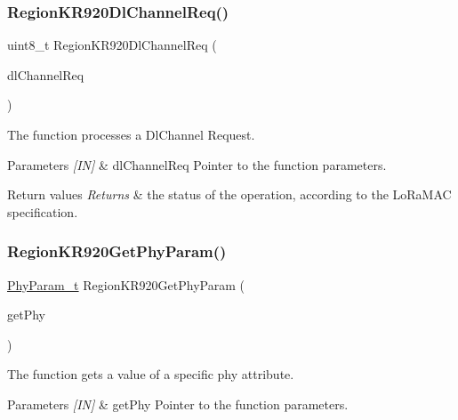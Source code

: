 \subsubsection{\texorpdfstring{Region\+K\+R920\+Dl\+Channel\+Req()}{RegionKR920DlChannelReq()}}
{\footnotesize\ttfamily uint8\+\_\+t Region\+K\+R920\+Dl\+Channel\+Req (\begin{DoxyParamCaption}\item[{\hyperlink{group__REGION_gae0d608ff1f8ea0a430e4f9a4c38ec7f3}{Dl\+Channel\+Req\+Params\+\_\+t} $\ast$}]{dl\+Channel\+Req }\end{DoxyParamCaption})}



The function processes a Dl\+Channel Request. 


\begin{DoxyParams}{Parameters}
{\em \mbox{[}\+I\+N\mbox{]}} & dl\+Channel\+Req Pointer to the function parameters.\\
\hline
\end{DoxyParams}

\begin{DoxyRetVals}{Return values}
{\em Returns} & the status of the operation, according to the Lo\+Ra\+M\+AC specification. \\
\hline
\end{DoxyRetVals}
\mbox{\label{group__REGIONKR920_ga108b8547f585d92dd1198c18fc262fa2}} 
\subsubsection{\texorpdfstring{Region\+K\+R920\+Get\+Phy\+Param()}{RegionKR920GetPhyParam()}}
{\footnotesize\ttfamily \hyperlink{group__REGION_gaed159b26e5c4677236b6e8677019db30}{Phy\+Param\+\_\+t} Region\+K\+R920\+Get\+Phy\+Param (\begin{DoxyParamCaption}\item[{\hyperlink{group__REGION_gab471483fff904f4f89bbc03f7fc380ab}{Get\+Phy\+Params\+\_\+t} $\ast$}]{get\+Phy }\end{DoxyParamCaption})}



The function gets a value of a specific phy attribute. 


\begin{DoxyParams}{Parameters}
{\em \mbox{[}\+I\+N\mbox{]}} & get\+Phy Pointer to the function parameters.\\
\hline
\end{DoxyParams}

